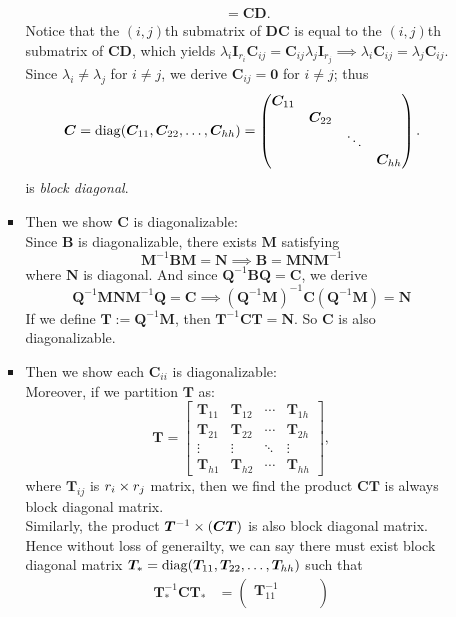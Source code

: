 \begin{enumerate}
\begin{enumerate}
\begin{itemize}
\[\begin{aligned}
&=\bm C\bm D.
\end{aligned}
\]
Notice that the $(i,j)$th submatrix of $\bm{DC}$ is equal to the $(i,j)$th submatrix of $\bm{CD}$, which yields $\lambda_i\bm I_{r_i}\bm C_{ij}=\bm C_{ij}\lambda_j\bm I_{r_j}\implies\lambda_i\bm C_{ij}=\lambda_j\bm C_{ij}$.\\
Since $\lambda_i\ne\lambda_j$ for $i\ne j$, we derive $\bm C_{ij}=\bm0$ for $i\ne j$; thus 
\[
\bm C=\operatorname{diag}(\bm C_{11},\bm C_{22},\dots,\bm C_{hh})
=
\begin{pmatrix}
\bm C_{11}&  &  &\\
&\bm C_{22}&  &\\
&&\ddots&\\
&&&\bm C_{hh}
\end{pmatrix}.
\]
is \textit{block diagonal}.
\item
Then we show $\bm C$ is diagonalizable:\\
Since $\bm B$ is diagonalizable, there exists $\bm M$ satisfying
\[
\bm M^{-1}\bm B\bm M=\bm N\implies
\bm B=\bm M\bm N\bm M^{-1}
\]
where $\bm N$ is diagonal. And since $\bm Q^{-1}\bm B\bm Q=\bm C$, we derive
\[
\bm Q^{-1}\bm M\bm N\bm M^{-1}\bm Q=\bm C
\implies(\bm Q^{-1}\bm M)^{-1}\bm C(\bm Q^{-1}\bm M)=\bm N
\]
If we define $\bm T:=\bm Q^{-1}\bm M$, then $\bm T^{-1}\bm C\bm T=\bm N$. So $\bm C$ is also diagonalizable.
\item
Then we show each $\bm C_{ii}$ is diagonalizable:\\
Moreover, if we partition $\bm T$ as:
\[
\bm T=\begin{bmatrix}
\bm T_{11}&\bm T_{12}&\cdots&\bm T_{1h}\\
\bm T_{21}&\bm T_{22}&\cdots&\bm T_{2h}\\
\vdots&\vdots&\ddots&\vdots\\
\bm T_{h1}&\bm T_{h2}&\cdots&\bm T_{hh}
\end{bmatrix},
\]
where $\bm T_{ij}$ is $r_i\times r_j$ matrix, then we find the product $\bm{CT}$ is always block diagonal matrix.\\
Similarly, the product $\bm T^{-1}\times(\bm{CT})$ is also block diagonal matrix.\\
Hence without loss of generailty, we can say there must exist block diagonal matrix $\bm T_{*}=\operatorname{diag}(\bm T_{11},\bm T_{22},\dots,\bm T_{hh})$ such that
\begin{equation}\label{eq_5.7}
\begin{aligned}
\bm T_*^{-1}\bm C\bm T_*&=\begin{pmatrix}
\bm T_{11}^{-1}&  &  &\\

\end{pmatrix}
\end{aligned}
\end{equation}
\end{itemize}
\end{enumerate}
\end{enumerate}
